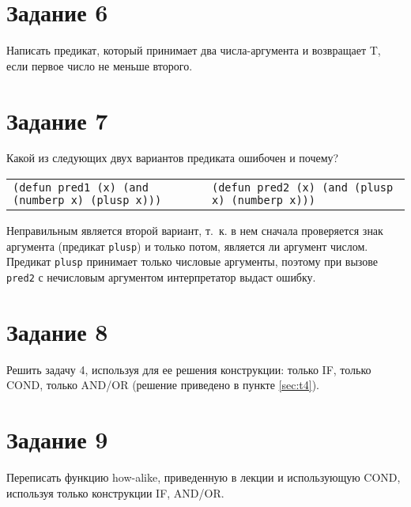 \section{Задание 6}

Написать предикат, который принимает два числа-аргумента и возвращает T, если первое число не меньше второго.


\section{Задание 7}

Какой из следующих двух вариантов предиката ошибочен и почему?
\begin{table}[H]
	\begin{tabularx}{\textwidth}{XX}
		\texttt{(defun pred1 (x) \newline (and (numberp x) (plusp x)))} & 
		\texttt{(defun pred2 (x) \newline (and (plusp x) (numberp x)))} \\
	\end{tabularx}
\end{table}

Неправильным является второй вариант, т.~к. в нем сначала проверяется знак аргумента (предикат \texttt{plusp}) и только потом, является ли аргумент числом. Предикат \texttt{plusp} принимает только числовые аргументы, поэтому при вызове \texttt{pred2} с нечисловым аргументом интерпретатор выдаст ошибку.

\section{Задание 8}

Решить задачу 4, используя для ее решения конструкции: только IF, только COND, только AND/OR (решение приведено в пункте \ref{sec:t4}).



\section{Задание 9}

Переписать функцию how-alike, приведенную в лекции и использующую COND, используя только конструкции IF, AND/OR.



